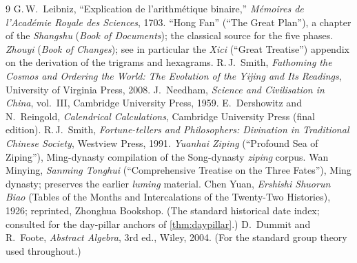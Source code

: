 \documentclass[11pt,a4paper]{article}
\theoremstyle{definition}
\theoremstyle{remark}
\begin{document}
\clearpage
\begin{thebibliography}{9}
 G.\,W.~Leibniz, ``Explication de l'arithm\'etique binaire,'' \emph{M\'emoires de l'Acad\'emie Royale des Sciences}, 1703.
 ``Hong Fan'' (``The Great Plan''), a chapter of the \emph{Shangshu} (\emph{Book of Documents}); the classical source for the five phases.
 \emph{Zhouyi} (\emph{Book of Changes}); see in particular the \emph{Xici} (``Great Treatise'') appendix on the derivation of the trigrams and hexagrams.
 R.\,J.~Smith, \emph{Fathoming the Cosmos and Ordering the World: The Evolution of the Yijing and Its Readings}, University of Virginia Press, 2008.
 J.~Needham, \emph{Science and Civilisation in China}, vol.\ III, Cambridge University Press, 1959.
 E.~Dershowitz and N.~Reingold, \emph{Calendrical Calculations}, Cambridge University Press (final edition).
 R.\,J.~Smith, \emph{Fortune-tellers and Philosophers: Divination in Traditional Chinese Society}, Westview Press, 1991.
 \emph{Yuanhai Ziping} (``Profound Sea of Ziping''), Ming-dynasty compilation of the Song-dynasty \emph{ziping} corpus.
 Wan Minying, \emph{Sanming Tonghui} (``Comprehensive Treatise on the Three Fates''), Ming dynasty; preserves the earlier \emph{luming} material.
 Chen Yuan, \emph{Ershishi Shuorun Biao} (Tables of the Months and Intercalations of the Twenty-Two Histories), 1926; reprinted, Zhonghua Bookshop. (The standard historical date index; consulted for the day-pillar anchors of \cref{thm:daypillar}.)
 D.~Dummit and R.~Foote, \emph{Abstract Algebra}, 3rd ed., Wiley, 2004. (For the standard group theory used throughout.)
\end{thebibliography}
\end{document}
